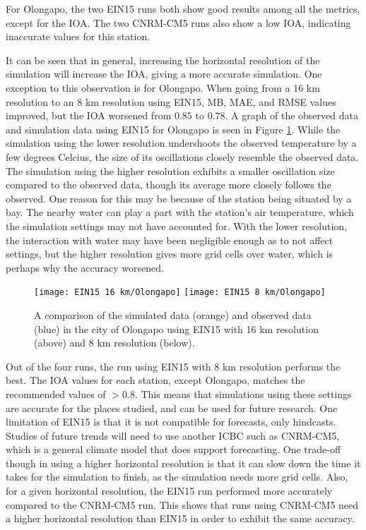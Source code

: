 		For Olongapo, the two EIN15 runs both show good results among all the metrics, except for the IOA.
		The two CNRM-CM5 runs also show a low IOA, indicating inaccurate values for this station.
		
		It can be seen that in general, increasing the horizontal resolution of the simulation will increase the IOA, giving a more accurate simulation.
		One exception to this observation is for Olongapo.
		When going from a 16 km resolution to an 8 km resolution using EIN15, MB, MAE, and RMSE values improved, but the IOA worsened from $0.85$ to $0.78$.
		A graph of the observed data and simulation data using EIN15 for Olongapo is seen in Figure \ref{fig:ein15-sim-vs-observed-olongapo}.
		While the simulation using the lower resolution undershoots the observed temperature by a few degrees Celcius, the size of its oscillations closely resemble the observed data.
		The simulation using the higher resolution exhibits a smaller oscillation size compared to the observed data, though its average more closely follows the observed.
		One reason for this may be because of the station being situated by a bay.
		The nearby water can play a part with the station’s air temperature, which the simulation settings may not have accounted for.
		With the lower resolution, the interaction with water may have been negligible enough as to not affect settings, but the higher resolution gives more grid cells over water, which is perhaps why the accuracy worsened.		
		
		\begin{figure}	
			\centering
			\texttt{[image: EIN15 16 km/Olongapo]}
			\texttt{[image: EIN15 8 km/Olongapo]}
			\caption{
				A comparison of the simulated data (orange) and observed data (blue) in the city of Olongapo using EIN15 with 16 km resolution (above) and 8 km resolution (below).
			}
			\label{fig:ein15-sim-vs-observed-olongapo}
		\end{figure}
		
		Out of the four runs, the run using EIN15 with 8 km resolution performs the best.
		The IOA values for each station, except Olongapo, matches the recommended values of $> 0.8$.
		This means that simulations using these settings are accurate for the places studied, and can be used for future research.
		One limitation of EIN15 is that it is not compatible for forecasts, only hindcasts. Studies of future trends will need to use another ICBC such as CNRM-CM5, which is  a general climate model that does support forecasting.
		One trade-off though in using a higher horizontal resolution is that it can slow down the time it takes for the simulation to finish, as the simulation needs more grid cells.
		Also, for a given horizontal resolution, the EIN15 run performed more accurately compared to the CNRM-CM5 run. 
		This shows that runs using CNRM-CM5 need a higher horizontal resolution than EIN15 in order to exhibit the same accuracy.

